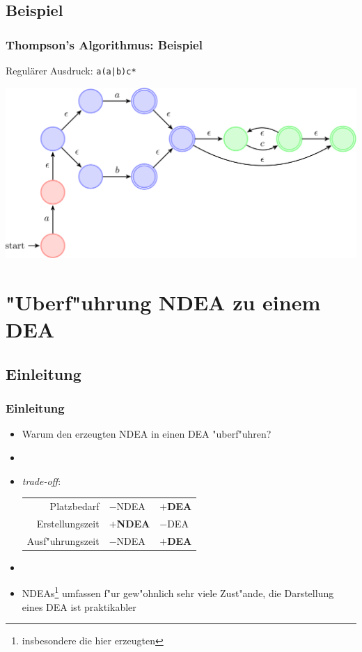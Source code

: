 \documentclass[ignorenonframetext]{beamer}
\begin{document}
\subsection{Beispiel}
\begin{frame}
    \frametitle{Thompson's Algorithmus: Beispiel}
    
    Regulärer Ausdruck: \texttt{a(a|b)c*}
    \vspace{0.5cm}
	
    \begin{centering}
		\includegraphics[scale=0.23]{aabc.pdf}
	\end{centering}
\end{frame}




\section{"Uberf"uhrung NDEA zu einem DEA}


\subsection*{Einleitung}
\begin{frame}
    \frametitle{Einleitung}

    \begin{itemize}
        \item[] Warum den erzeugten NDEA in einen DEA "uberf"uhren?
        \item[]
        \item \textit{trade-off}:
        \begin{tabular}{rll}
            Platzbedarf & $-$NDEA & \textbf{$\mathbf{+}$DEA}\\
            Erstellungszeit & \textbf{$\mathbf{+}$NDEA} & $-$DEA\\
            Ausf"uhrungszeit & $-$NDEA & \textbf{$\mathbf{+}$DEA}\\
        \end{tabular}
        \item[]
        \item NDEAs\footnote{insbesondere die hier erzeugten} umfassen f"ur gew"ohnlich sehr viele Zust"ande, die Darstellung eines DEA ist praktikabler         
    \end{itemize}

\end{frame}
\end{document}
